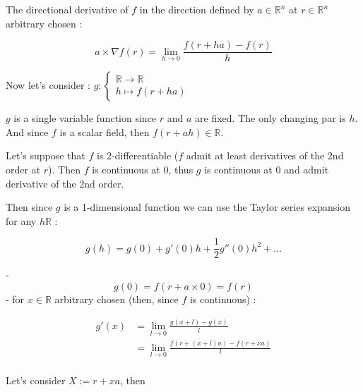 \documentclass[12pt]{article}
\begin{document}
The directional derivative of $f$ in the direction defined by $a \in \mathbb{R}^n$ at $r \in \mathbb{R}^n$ arbitrary chosen :

$$
a \times \nabla f(r) = \lim_{h \rightarrow 0} \frac{f(r+ha)-f(r)}{h}
$$

Now let's consider :
$
g : \begin{cases}
\mathbb{R} \rightarrow \mathbb{R} \\
h \mapsto f(r+ha)
\end{cases}
$

$g$ is a single variable function since $r$ and $a$ are fixed. The only changing par is $h$. And since $f$ is a scalar field, then $f(r+ah) \in \mathbb{R}$.

Let's suppose that $f$ is 2-differentiable ($f$ admit at least derivatives of the 2nd order at $r$). Then $f$ is continuous at $0$, thus $g$ is continuous at $0$ and admit derivative of the 2nd order.

Then since $g$ is a 1-dimensional function we can use the Taylor series expansion for any $h \mathbb{R}$ :

$$
g(h) = g(0) + g'(0)h + \frac{1}{2}g''(0)h^2 + ...
$$

- 
$$
g(0) = f(r+a \times 0) = f(r)
$$
- for $x \in \mathbb{R}$ arbitrary chosen (then, since $f$ is continuous) :

\begin{equation*}
    \begin{split}
        g'(x) &= \lim_{l \rightarrow 0} \frac{g(x+l)-g(x)}{l} \\
        &=  \lim_{l \rightarrow 0} \frac{f(r+(x+l)a)-f(r+xa)}{l} \\
    \end{split}
\end{equation*}

Let's consider $X := r+xa$, then
\end{document}

